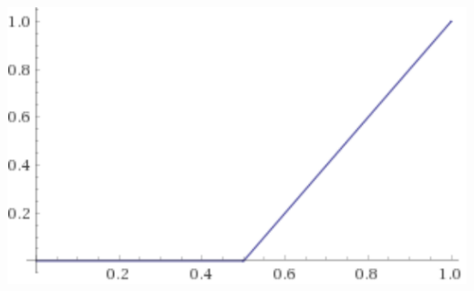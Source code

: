\documentclass{beamer}
\begin{document}
\begin{frame}
\begin{columns}
\begin{minipage}[c][0.4\textheight][c]{\linewidth}
\end{minipage}
\begin{minipage}[c][0.4\textheight][c]{\linewidth}
  \centering
  \includegraphics[width=0.7\linewidth]{lukaDiag}
\end{minipage}
\end{columns}
\end{frame}
\end{document}

